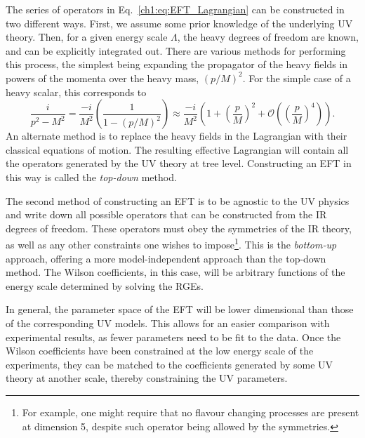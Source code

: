The series of operators in Eq.~\ref{ch1:eq:EFT_Lagrangian} can be constructed in two different ways. First, we assume some prior knowledge of the underlying UV theory. Then, for a given energy scale $\Lambda$, the heavy degrees of freedom are known, and can be explicitly integrated out. There are various methods for performing this process, the simplest being expanding the propagator of the heavy fields in powers of the momenta over the heavy mass, $(p/M)^2$. For the simple case of a heavy scalar, this corresponds to 
\begin{equation}
    \frac{i}{p^2 - M^2} = \frac{-i}{M^2}\left(\frac{1}{1 - (p/M)^2}\right)\approx \frac{-i}{M^2}\left( 1 + \left(\frac{p}{M}\right)^2 + \mathcal{O}\left(\left(\frac{p}{M}\right)^4\right)\right).
\end{equation}
An alternate method is to replace the heavy fields in the Lagrangian with their classical equations of motion. The resulting effective Lagrangian will contain all the operators generated by the UV theory at tree level.
Constructing an EFT in this way is called the \textit{top-down} method.

The second method of constructing an EFT is to be agnostic to the UV physics and write down all possible operators that can be constructed from the IR degrees of freedom. These operators must obey the symmetries of the IR theory, as well as any other constraints one wishes to impose\footnote{For example, one might require that no flavour changing processes are present at dimension 5, despite such operator being allowed by the symmetries.}. This is the \textit{bottom-up} approach, offering a more model-independent approach than the top-down method. The Wilson coefficients, in this case, will be arbitrary functions of the energy scale determined by solving the RGEs.

In general, the parameter space of the EFT will be lower dimensional than those of the corresponding UV models. This allows for an easier comparison with experimental results, as fewer parameters need to be fit to the data. Once the Wilson coefficients have been constrained at the low energy scale of the experiments, they can be matched to the coefficients generated by some UV theory at another scale, thereby constraining the UV parameters. 

